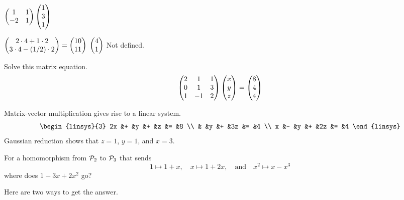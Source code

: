 \begin{exercises}
\begin{exparts*}
      \partsitem $\begin{pmatrix}
                    1  &1  \\
                    -2  &1
                  \end{pmatrix}
                  \begin{pmatrix} 1 \\ 3 \\ 1 \end{pmatrix}$
    \end{exparts*}
    \begin{answer}
      \begin{exparts*}
        \partsitem $\begin{pmatrix} 2\cdot 4 +1\cdot 2 \\
                            3\cdot 4-(1/2)\cdot 2 \end{pmatrix}
                   =\begin{pmatrix} 10 \\ 11 \end{pmatrix}$
        \partsitem $\begin{pmatrix} 4 \\ 1 \end{pmatrix}$
        \partsitem Not defined.
      \end{exparts*}
    \end{answer}
  \recommended \item  
    Solve this matrix equation.
    \begin{equation*}
      \begin{pmatrix}
        2  &1  &1  \\
        0  &1  &3  \\
        1  &-1 &2
      \end{pmatrix}
      \begin{pmatrix} x \\ y \\ z \end{pmatrix}
      =\begin{pmatrix} 8 \\ 4 \\ 4 \end{pmatrix}
    \end{equation*}
    \begin{answer}
      Matrix-vector multiplication gives rise to a linear system.
      \begin{equation*}
        \begin{linsys}{3}
          2x  &+  &y  &+  &z  &=  &8  \\
              &   &y  &+  &3z &=  &4  \\
           x  &-  &y  &+  &2z &=  &4 
        \end{linsys}
      \end{equation*}
      Gaussian reduction shows that \( z=1 \), \( y=1 \), and \( x=3 \).  
    \end{answer}
  \recommended \item 
    For a homomorphism from \( \mathcal{P}_2 \) to \( \mathcal{P}_3 \) that sends
    \begin{equation*}
      1\mapsto 1+x,
      \quad
      x\mapsto 1+2x,
      \quad\text{and}\quad
      x^2\mapsto x-x^3
    \end{equation*}
    where does \( 1-3x+2x^2 \) go?
    \begin{answer}
      Here are two ways to get the answer.


\end{answer}
\end{exercises}
